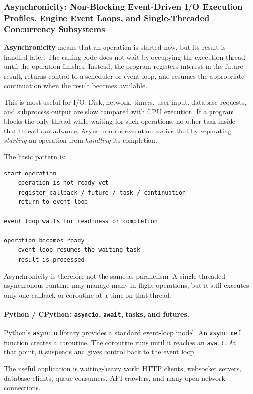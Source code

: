 \subsubsection{Asynchronicity: Non-Blocking Event-Driven I/O Execution Profiles, Engine Event Loops, and Single-Threaded Concurrency Subsystems}

\textbf{Asynchronicity} means that an operation is started now, but its result is handled later. The calling code does not wait by occupying the execution thread until the operation finishes. Instead, the program registers interest in the future result, returns control to a scheduler or event loop, and resumes the appropriate continuation when the result becomes available.

This is most useful for I/O. Disk, network, timers, user input, database requests, and subprocess output are slow compared with CPU execution. If a program blocks the only thread while waiting for such operations, no other task inside that thread can advance. Asynchronous execution avoids that by separating \emph{starting} an operation from \emph{handling} its completion.

The basic pattern is:

\begin{verbatim}
start operation
    operation is not ready yet
    register callback / future / task / continuation
    return to event loop

event loop waits for readiness or completion

operation becomes ready
    event loop resumes the waiting task
    result is processed
\end{verbatim}

Asynchronicity is therefore not the same as parallelism. A single-threaded asynchronous runtime may manage many in-flight operations, but it still executes only one callback or coroutine at a time on that thread.

\paragraph{Python / CPython: \texttt{asyncio}, \texttt{await}, tasks, and futures.}

Python's \texttt{asyncio} library provides a standard event-loop model. An \texttt{async def} function creates a coroutine. The coroutine runs until it reaches an \texttt{await}. At that point, it suspends and gives control back to the event loop.

The useful application is waiting-heavy work: HTTP clients, websocket servers, database clients, queue consumers, API crawlers, and many open network connections.

